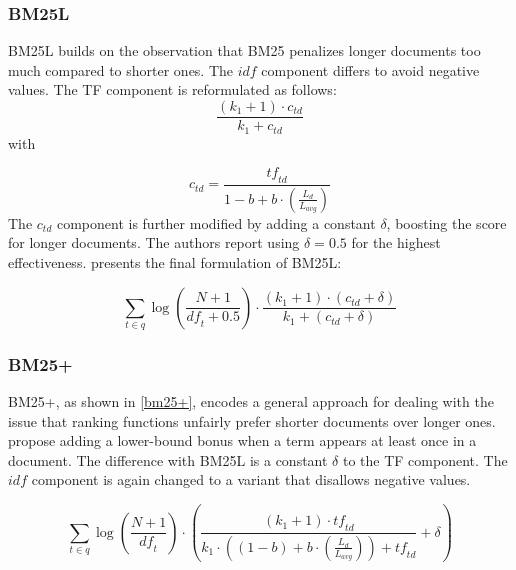 \subsubsection{BM25L~\citep{bm25l}}
BM25L builds on the observation that BM25 penalizes longer documents too much compared to shorter ones. The $\mathit{idf}$ component differs to avoid negative values. The TF component is reformulated as follows:
\begin{equation}
	\frac{\left(k_1+1\right)\cdot c_{\mathit{td}}}{k_1+c_{\mathit{td}}}  
\end{equation}
with 

\begin{equation}
	c_{\mathit{td}} = \frac{\mathit{tf}_{\mathit{td}}}{1 - b + b \cdot \left(\frac{L_d}{L_{\mathit{avg}}}\right)}  
\end{equation}
The $c_{td}$ component is further modified by adding a constant $\delta$, boosting the score for longer documents. The authors report using $\delta = 0.5$ for the highest effectiveness.  presents the final formulation of BM25L:

\begin{equation}
	\label{bm25l}
	\sum_{t\in q} \log\left(\frac{N+1}{\mathit{df}_t + 0.5}\right)\cdot\frac{(k_1 + 1)\cdot(c_{\mathit{td}} + \delta)}{k_1 + (c_{\mathit{td}} + \delta)}
\end{equation}

\subsubsection{BM25+~\citep{bm25+}}
BM25+, as shown in \cref{bm25+}, encodes a general approach for dealing with the issue that ranking functions unfairly prefer shorter documents over longer ones.  propose adding a lower-bound bonus when a term appears at least once in a document. The difference with BM25L is a constant $\delta$ to the TF component. The $\mathit{idf}$ component is again changed to a variant that disallows negative values.

\begin{equation}
	\label{bm25+}
	\sum_{t\in q} \log\left(\frac{N+1}{\mathit{df}_t}\right)\cdot\left(\frac{\left(k_1 + 1\right)\cdot \mathit{tf}_{\mathit{td}}}{k_1\cdot\left(\left(1-b\right)+b\cdot\left(\frac{L_d}{L_{\mathit{avg}}}\right)\right)+\mathit{tf}_{\mathit{td}}}+\delta\right)
\end{equation}

